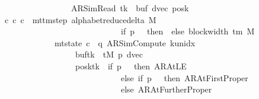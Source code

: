 \begin{isabellebody}
\ \ \ \ \ \ \ \ \ \ \ \ \ \ \ \ \ \ \ {\isacharparenleft}{\kern0pt}AR{\isacharunderscore}{\kern0pt}SimRead{\isacharcomma}{\kern0pt}\ tk{\isacharcomma}{\kern0pt}\ {}{\isacharcomma}{\kern0pt}\ buf{\isacharcomma}{\kern0pt}\ dvec{\isacharcomma}{\kern0pt}\ posk{\isacharparenright}{\kern0pt}{\isachardoublequoteclose}\isanewline
\ \ \ {\isachardoublequoteopen}{\isasymexists}c{\isacharprime}{\kern0pt}{\isacharprime}{\kern0pt}{\isachardot}{\kern0pt}\ {\isacharparenleft}{\kern0pt}c{\isacharprime}{\kern0pt}{\isacharcomma}{\kern0pt}\ c{\isacharprime}{\kern0pt}{\isacharprime}{\kern0pt}{\isacharparenright}{\kern0pt}\ {\isasymin}\ {\isacharparenleft}{\kern0pt}mttm{\isacharunderscore}{\kern0pt}step\ {\isacharparenleft}{\kern0pt}alphabet{\isacharunderscore}{\kern0pt}reduce{\isacharunderscore}{\kern0pt}delta\ M{\isacharparenright}{\kern0pt}{\isacharparenright}{\kern0pt}\isanewline
\ \ \ \ \ \ \ \ \ \ \ \ \ \ \ \ \ \ \ \ \ \ \ \ \ \ \ \ \ \ {\isacharcircum}{\kern0pt}{\isacharcircum}{\kern0pt}\ {\isacharparenleft}{\kern0pt}if\ p\ {\isacharequal}{\kern0pt}\ {}\ then\ {}\ else\ block{\isacharunderscore}{\kern0pt}width\ {\isacharparenleft}{\kern0pt}{\isasymGamma}{\isacharunderscore}{\kern0pt}tm\ M{\isacharparenright}{\kern0pt}\ {\isacharplus}{\kern0pt}\ {}{\isacharparenright}{\kern0pt}\isanewline
\ \ \ \ \ \ \ \ \ \ \ \ \ \ {\isasymand}\ mt{\isacharunderscore}{\kern0pt}state\ c{\isacharprime}{\kern0pt}{\isacharprime}{\kern0pt}\ {\isacharequal}{\kern0pt}\ {\isacharparenleft}{\kern0pt}q{\isacharcomma}{\kern0pt}\ AR{\isacharunderscore}{\kern0pt}SimCompute{\isacharcomma}{\kern0pt}\ k{\isacharunderscore}{\kern0pt}unidx\ {}{\isacharcomma}{\kern0pt}\ {}{\isacharcomma}{\kern0pt}\isanewline
\ \ \ \ \ \ \ \ \ \ \ \ \ \ \ \ \ \ \ \ buf{\isacharparenleft}{\kern0pt}tk\ {\isacharcolon}{\kern0pt}{\isacharequal}{\kern0pt}\ tM\ p{\isacharparenright}{\kern0pt}{\isacharcomma}{\kern0pt}\ dvec{\isacharcomma}{\kern0pt}\isanewline
\ \ \ \ \ \ \ \ \ \ \ \ \ \ \ \ \ \ \ \ posk{\isacharparenleft}{\kern0pt}tk\ {\isacharcolon}{\kern0pt}{\isacharequal}{\kern0pt}\ if\ p\ {\isacharequal}{\kern0pt}\ {}\ then\ AR{\isacharunderscore}{\kern0pt}AtLE\isanewline
\ \ \ \ \ \ \ \ \ \ \ \ \ \ \ \ \ \ \ \ \ \ \ \ \ \ \ \ \ \ \ else\ if\ p\ {\isacharequal}{\kern0pt}\ {}\ then\ AR{\isacharunderscore}{\kern0pt}AtFirstProper\isanewline
\ \ \ \ \ \ \ \ \ \ \ \ \ \ \ \ \ \ \ \ \ \ \ \ \ \ \ \ \ \ \ else\ AR{\isacharunderscore}{\kern0pt}AtFurtherProper{\isacharparenright}{\kern0pt}{\isacharparenright}{\kern0pt}\isanewline

\end{isabellebody}
